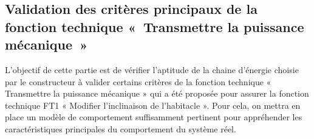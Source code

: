 \documentclass[10pt,fleqn]{article} %
\begin{document}
\begin{multicols}{2}


%
%


\subsection*{Validation des critères principaux de la fonction technique «~Transmettre la puissance mécanique~»}

\begin{obj}
L'objectif de cette partie est de vérifier l'aptitude de la chaine d'énergie choisie par le constructeur à valider certains critères de la fonction technique « Transmettre la puissance mécanique » qui a été proposée pour assurer la fonction technique FT1 « Modifier l'inclinaison de l'habitacle ». Pour cela, on mettra en place un modèle de comportement suffisamment pertinent pour appréhender les caractéristiques principales du comportement du système réel.
\end{obj}



\end{multicols}
\end{document}
